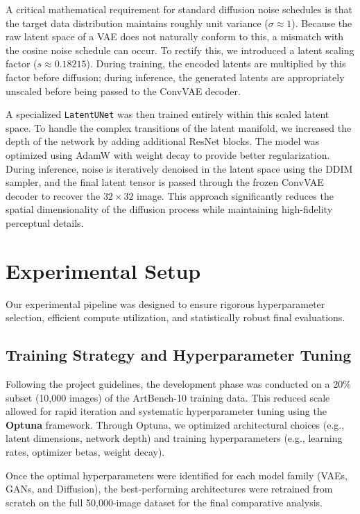 \documentclass[runningheads]{llncs}
\begin{document}
A critical mathematical requirement for standard diffusion noise schedules is that the target data distribution maintains roughly unit variance ($\sigma \approx 1$). Because the raw latent space of a VAE does not naturally conform to this, a mismatch with the cosine noise schedule can occur. To rectify this, we introduced a latent scaling factor ($s \approx 0.18215$). During training, the encoded latents are multiplied by this factor before diffusion; during inference, the generated latents are appropriately unscaled before being passed to the ConvVAE decoder.

A specialized \texttt{LatentUNet} was then trained entirely within this scaled latent space. To handle the complex transitions of the latent manifold, we increased the depth of the network by adding additional ResNet blocks. The model was optimized using AdamW with weight decay to provide better regularization. During inference, noise is iteratively denoised in the latent space using the DDIM sampler, and the final latent tensor is passed through the frozen ConvVAE decoder to recover the $32 \times 32$ image. This approach significantly reduces the spatial dimensionality of the diffusion process while maintaining high-fidelity perceptual details.

\section{Experimental Setup}

Our experimental pipeline was designed to ensure rigorous hyperparameter selection, efficient compute utilization, and statistically robust final evaluations.

\subsection{Training Strategy and Hyperparameter Tuning}
Following the project guidelines, the development phase was conducted on a 20\% subset (10,000 images) of the ArtBench-10 training data. This reduced scale allowed for rapid iteration and systematic hyperparameter tuning using the \textbf{Optuna} framework. Through Optuna, we optimized architectural choices (e.g., latent dimensions, network depth) and training hyperparameters (e.g., learning rates, optimizer betas, weight decay). 

Once the optimal hyperparameters were identified for each model family (VAEs, GANs, and Diffusion), the best-performing architectures were retrained from scratch on the full 50,000-image dataset for the final comparative analysis.
\end{document}
